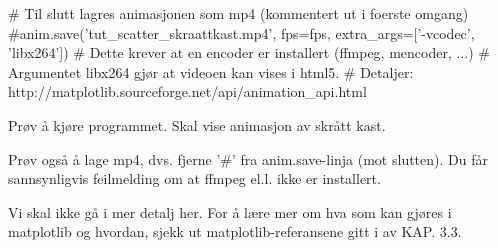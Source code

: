 # Til slutt lagres animasjonen som mp4 (kommentert ut i foerste omgang)
#anim.save('tut_scatter_skraattkast.mp4', fps=fps, extra_args=['-vcodec', 'libx264'])
# Dette krever at en encoder er installert (ffmpeg, mencoder, ...)
# Argumentet libx264 gjør at videoen kan vises i html5. 
# Detaljer:  http://matplotlib.sourceforge.net/api/animation_api.html




Prøv å kjøre programmet. 
Skal vise animasjon av skrått kast. 

Prøv også å lage mp4, dvs. fjerne '#' fra anim.save-linja (mot slutten).
Du får sannsynligvis feilmelding om at ffmpeg el.l. ikke er installert. 

Vi skal ikke gå i mer detalj her.
For å lære mer om hva som kan gjøres i matplotlib og hvordan,
sjekk ut matplotlib-referansene gitt i av KAP. 3.3. 
